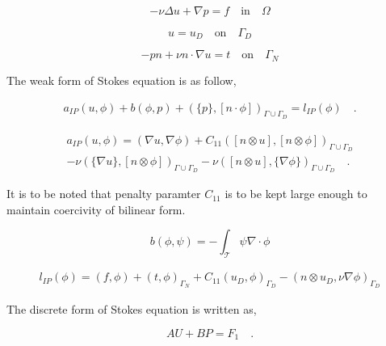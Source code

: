 \documentclass[a4paper]{book}
\begin{document}
\begin{equation} \label{stokes_strong_form_ch3}
-\nu \Delta u + \nabla p = f \quad \textrm{in} \quad \Omega
\end{equation}

\begin{equation} \label{dirichlet condition stokes_ch3}
u = u_D \quad \textrm{on} \quad \Gamma_D
\end{equation}

\begin{equation} \label{neumann condition stokes_ch3}
-pn + \nu n \cdot \nabla u = t \quad \textrm{on} \quad \Gamma_N
\end{equation}

The weak form of Stokes equation is as follow,

\begin{equation}\label{stokes_weak_ch3}
\begin{split}
a_{IP}(u,\phi) + b(\phi,p) + (\{p\},[n\cdot \phi])_{\Gamma \cup \Gamma_D} = l_{IP}(\phi) \quad \textrm{.}
\end{split}
\end{equation}

\begin{equation}
\begin{split}
a_{IP}(u,\phi) = (\nabla u, \nabla \phi) + C_{11} ([n \otimes u],[n \otimes \phi])_{\Gamma \cup \Gamma_D} \\
- \nu (\{\nabla u\},[n \otimes \phi])_{\Gamma \cup \Gamma_D} - \nu ([n \otimes u],\{\nabla \phi\})_{\Gamma \cup \Gamma_D} \quad \textrm{.}
\end{split}
\end{equation}

It is to be noted that penalty paramter $C_{11}$ is to be kept large enough to maintain coercivity of bilinear form.

\begin{equation}
b(\phi,\psi) = -\int_{\mathcal{T}} \psi \nabla \cdot \phi
\end{equation}

\begin{equation}
\begin{split}
l_{IP}(\phi) = (f,\phi) + (t,\phi)_{\Gamma_N} + C_{11} (u_D,\phi)_{\Gamma_D} - (n \otimes u_D, \nu \nabla \phi)_{\Gamma_D}
\end{split}
\end{equation}

The discrete form of Stokes equation is written as,

\begin{equation} \label{stokes discrete_ch3}
AU + BP = F_1 \quad \textrm{.}
\end{equation}
\end{document}
